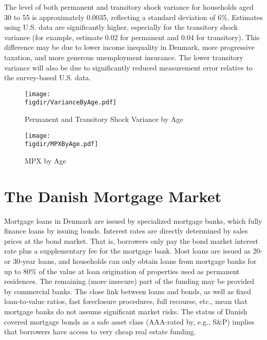 \documentclass[titlepage]{\econtex}\newcommand{\texname}{ConsumptionHeterogeneity}
\newcommand{\figdir}{../Code/Rcode/Figures/AEJ_revision}
\begin{document}
	The level of both permanent and transitory shock variance for households aged 30 to 55 is approximately 0.0035, reflecting a standard deviation of 6\%. Estimates using U.S. data are significantly higher, especially for the transitory shock variance (for example,  estimate 0.02 for permanent and 0.04 for transitory). This difference may be due to lower income inequality in Denmark, more progressive taxation, and more generous unemployment insurance. The lower transitory variance will also be due to significantly reduced measurement error relative to the survey-based U.S. data. 
	\begin{figure} 
		\begin{centering}
			\texttt{[image: \\figdir/VarianceByAge.pdf]} 
			\caption{Permanent and Transitory Shock Variance by Age}
			\label{fig:VarianceByAge}
		\end{centering}
	\end{figure}
	\begin{figure} 
		\begin{centering}
			\texttt{[image: \\figdir/MPXByAge.pdf]} 
			\caption{MPX by Age}
			\label{fig:MPXByAge}
		\end{centering}
	\end{figure}
	
	\section{The Danish Mortgage Market} \label{mortgage_market}
	\setcounter{figure}{0}   
	\setcounter{table}{0} 
	Mortgage loans in Denmark are issued by specialized mortgage banks, which fully finance loans by issuing bonds. Interest rates are directly determined by sales prices at the bond market. That is, borrowers only pay the bond market interest rate plus a supplementary fee for the mortgage bank. 
	Most loans are issued as 20- or 30-year loans, and households can only obtain loans from mortgage banks for up to 80\% of the value at loan origination of properties used as permanent residences. The remaining (more insecure) part of the funding may be provided by commercial banks. The close link between loans and bonds, as well as fixed loan-to-value ratios, fast foreclosure procedures, full recourse, etc., mean that mortgage banks do not assume significant market risks. The status of Danish covered mortgage bonds as a safe asset class (AAA-rated by, e.g., S\&P) implies that borrowers have access to very cheap real estate funding.
	
\end{document}
